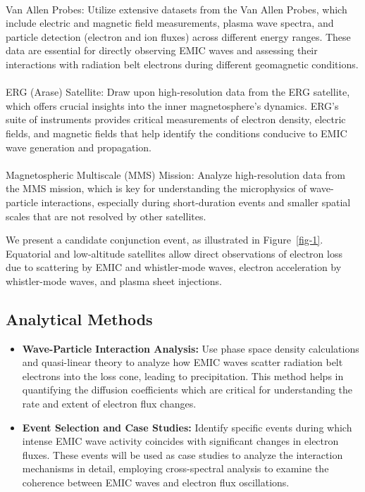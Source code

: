\documentclass[
  letterpaper,
  DIV=11,
  numbers=noendperiod]{scrartcl}
\makeatletter
\let\oldparagraph\paragraph
\renewcommand{\paragraph}{
    \@ifstar
      \xxxParagraphStar
      \xxxParagraphNoStar
  }
\newcommand{\xxxParagraphStar}[1]{\oldparagraph*{#1}\mbox{}}
\newcommand{\xxxParagraphNoStar}[1]{\oldparagraph{#1}\mbox{}}
\makeatother
\begin{document}
\paragraph{Van Allen Probes:}\label{van-allen-probes}
Utilize extensive datasets from the Van Allen Probes, which include electric and magnetic field measurements, plasma wave spectra, and particle detection (electron and ion fluxes) across different energy ranges. These data are essential for directly observing EMIC waves and assessing their interactions with radiation belt electrons during different geomagnetic conditions.

\paragraph{ERG (Arase) Satellite:}\label{erg-arase-satellite}
Draw upon high-resolution data from the ERG satellite, which offers crucial insights into the inner magnetosphere's dynamics. ERG's suite of instruments provides critical measurements of electron density, electric fields, and magnetic fields that help identify the conditions conducive to EMIC wave generation and propagation.

\paragraph{Magnetospheric Multiscale (MMS) Mission:}\label{magnetospheric-multiscale-mms-mission}
Analyze high-resolution data from the MMS mission, which is key for understanding the microphysics of wave-particle interactions, especially during short-duration events and smaller spatial scales that are not resolved by other satellites.

We present a candidate conjunction event, as illustrated in Figure~\ref{fig-1}. Equatorial and low-altitude satellites allow direct observations of electron loss due to scattering by EMIC and whistler-mode waves, electron acceleration by whistler-mode waves, and plasma sheet injections.

\subsection{Analytical Methods}\label{analytical-methods}

\begin{itemize}
\item
  \textbf{Wave-Particle Interaction Analysis:} Use phase space density calculations and quasi-linear theory to analyze how EMIC waves scatter radiation belt electrons into the loss cone, leading to precipitation. This method helps in quantifying the diffusion coefficients which are critical for understanding the rate and extent of electron flux changes.
\item
  \textbf{Event Selection and Case Studies:} Identify specific events during which intense EMIC wave activity coincides with significant changes in electron fluxes. These events will be used as case studies to analyze the interaction mechanisms in detail, employing cross-spectral analysis to examine the coherence between EMIC waves and electron flux oscillations.
\end{itemize}
\end{document}
